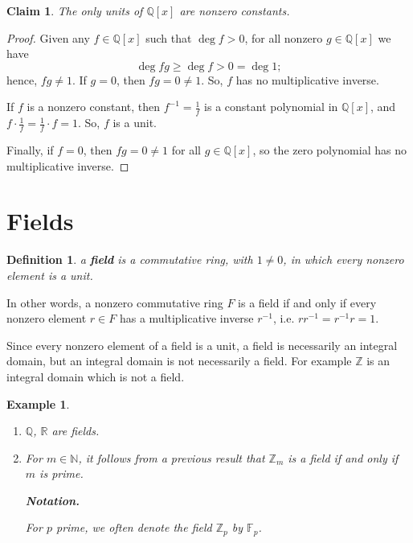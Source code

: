 \documentclass[a4paper,12pt]{report}
\newcounter{statement}
\numberwithin{statement}{chapter}
\newtheorem{defn}[statement]{Definition}
\newtheorem{claim}[statement]{Claim}
\newtheorem{eg}[statement]{\bf Example}
\numberwithin{equation}{chapter}
\numberwithin{section}{chapter}
\numberwithin{subsection}{section}
\begin{document}
\begin{claim}
The only units of $\mathbb{Q}[x]$ are nonzero constants.
\end{claim}
\begin{proof}

Given any $f \in \mathbb{Q}[x]$ such that $\deg f > 0$, for all nonzero $g \in \mathbb{Q}[x]$ we have
\[
\deg fg \geq \deg f > 0 = \deg 1;
\]
hence, $fg \neq 1$.  If $g = 0$, then $fg = 0 \neq 1$.
So, $f$ has no multiplicative inverse.


If $f$ is a nonzero constant, then $f^{-1} = \frac{1}{f}$ is a constant polynomial in $\mathbb{Q}[x]$, and
$f\cdot \frac{1}{f} = \frac{1}{f}\cdot f = 1$.  So, $f$ is a unit.


Finally, if $f = 0$, then $fg = 0 \neq 1$ for all $g \in \mathbb{Q}[x]$, so the zero polynomial
has no multiplicative inverse.


\end{proof}




\section{Fields}

\begin{defn}
a  {\bf field}  is a commutative ring, with $1 \neq 0$, in which every nonzero element is a unit.
\end{defn}

In other words, a nonzero commutative ring $F$ is a field if and only if every nonzero element $r \in F$
has a multiplicative inverse $r^{-1}$, i.e. $r r^{-1} = r^{-1} r = 1$.




Since every nonzero element of a field is a unit, a field is necessarily an integral domain,
but an integral domain is not necessarily a field.  For example $\mathbb{Z}$ is an integral domain
which is not a field.




\begin{eg}
\begin{enumerate}
\item 
$\mathbb{Q}$, $\mathbb{R}$ are fields.

\item 
For $m \in \mathbb{N}$,
it follows from a previous result that $\mathbb{Z}_m$ is a field if and only if $m$ is prime.



 {\bf Notation.} 

For $p$ prime, we often denote the field $\mathbb{Z}_p$ by $\mathbb{F}_p$.

\end{enumerate}
\end{eg}
\end{document}
